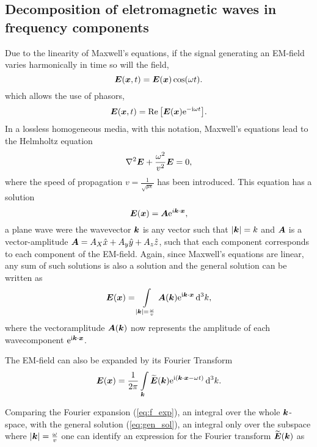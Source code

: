 \documentclass[11pt,a4paper, 
swedish,english %
]{article}
\begin{document}
\subsection{Decomposition of eletromagnetic waves in frequency components}

Due to the linearity of Maxwell's equations, if the signal generating an EM-field varies harmonically in time so will the field,
\begin{equation*}
\vb*E(\vb*x,t)=\vb*E(\vb*x)\cos(\omega t).
\end{equation*}
which allows the use of phasors,
\begin{equation*}
\vb*E(\vb*x,t)=\Re\qty[\vb*E(\vb*x)\mathrm{e}^{-\mathrm{i}\omega t}].
\end{equation*}
In a lossless homogeneous media, with this notation, Maxwell's equations lead to the Helmholtz equation
\begin{equation}
  \label{eq:Helmholtz}
  \laplacian  \vb*E + \frac{\omega^2}{v^2}\vb*E=0,
\end{equation} 
where the speed of propagation $v=\frac{1}{\sqrt{\mu \epsilon}}$ has been introduced. This equation has a solution
\begin{equation*}
\vb*E(\vb*x)=\vb*A\mathrm{e}^{i\vb*k \cdot \vb*x},
\end{equation*}
a plane wave were the wavevector $\vb*k$ is any vector such that $\abs{\vb*k}=k$ and $\vb*A$ is a vector-amplitude $\vb*A=A_X\hat{x}+A_y\hat{y}+A_z\hat{z}$, such that each component corresponds to each component of the  EM-field.
Again, since Maxwell's equations are linear, any sum of such solutions is also a solution and the general solution can be written as
\begin{equation}
  \label{eq:gen_sol}
  \vb*E(\vb*x)=\int_{\abs{\vb*k}=\frac{\omega}{v}}\vb*A(\vb*k)\ee^{\ii\vb*k\cdot\vb*x}\id^3k,
\end{equation}
where the vectoramplitude $\vb*A(\vb*k)$ now represents the amplitude of each wavecomponent $\mathrm{e}^{\mathrm{i}\vb*k \cdot \vb*x}$.

The EM-field can also be expanded by its Fourier Transform
\begin{equation}
  \label{eq:f_exp}
  \vb*E(\vb*x)=\frac{1}{2\pi}\int_{\vb*k} \widetilde{\vb*E}(\vb*k) \ee^{\ii(\vb*k\cdot\vb*x - \omega t)}\id^3k.
 \end{equation}


Comparing the Fourier expansion (\ref{eq:f_exp}), an integral over the whole $\vb*k$-space, with the general solution (\ref{eq:gen_sol}), an integral only over the subspace where $\abs{\vb*k}=\frac{\omega}{v}$ one can identify an expression for the Fourier transform $\widetilde{\vb*E}(\vb*k)$ as
\end{document}
